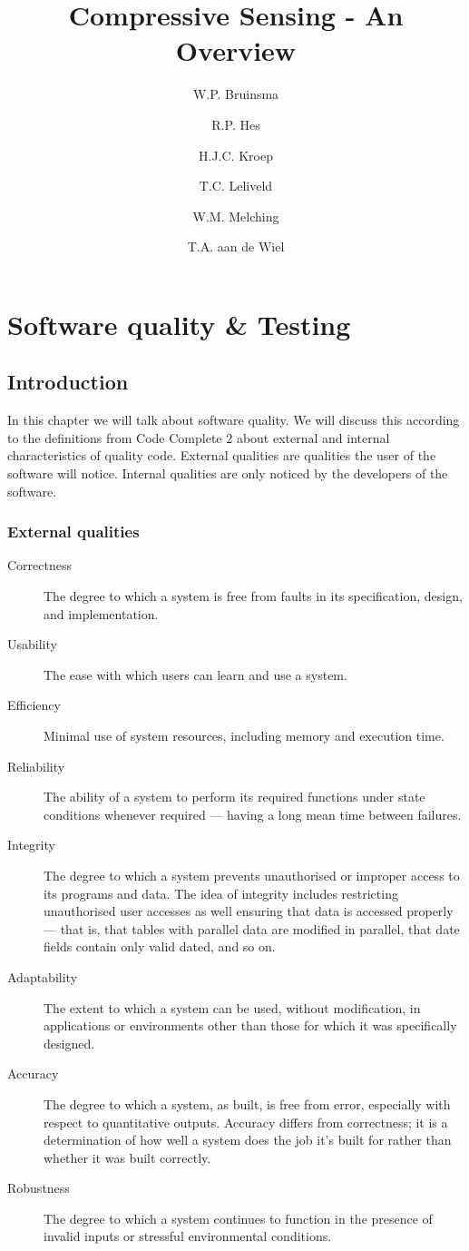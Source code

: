 \documentclass[a4paper, openany, oneside]{memoir}
\title{Compressive Sensing - An Overview}
\author{W.P. Bruinsma \and R.P. Hes \and H.J.C. Kroep \and T.C. Leliveld \and W.M. Melching \and T.A. aan de Wiel}
\begin{document}
\chapter{Software quality \& Testing}
\section{Introduction}
In this chapter we will talk about software quality. We will discuss this according to the definitions from Code Complete 2 about external and internal characteristics of quality code. External qualities are qualities the user of the software will notice. Internal qualities are only noticed by the developers of the software.\cite{mcconnell2004code}

\subsection{External qualities}
\begin{description}
\item[Correctness] The degree to which a system is free from faults in its specification, design, and implementation.
\item[Usability] The ease with which users can learn and use a system.
\item[Efficiency] Minimal use of system resources, including memory and execution time.
\item[Reliability] The ability of a system to perform its required functions under state conditions whenever required --- having a long mean time between failures.
\item[Integrity] The degree to which a system prevents unauthorised or improper access to its programs and data. The idea of integrity includes restricting unauthorised user accesses as well ensuring that data is accessed properly --- that is, that tables with parallel data are modified in parallel, that date fields contain only valid dated, and so on.
\item[Adaptability] The extent to which a system can be used, without modification, in applications or environments other than those for which it was specifically designed.
\item[Accuracy] The degree to which a system, as built, is free from error, especially with respect to quantitative outputs. Accuracy differs from correctness; it is a determination of how well a system does the job it's built for rather than whether it was built correctly.
\item[Robustness] The degree to which a system continues to function in the presence of invalid inputs or stressful environmental conditions.
\end{description}
\end{document}
